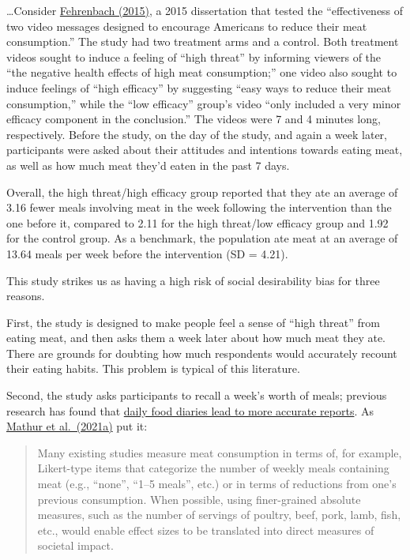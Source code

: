 \documentclass[
  man]{apa6}
\begin{document}
\ldots Consider \href{https://www.proquest.com/docview/1712399091?fromopenview=true&pq-origsite=gscholar}{Fehrenbach (2015)}, a 2015 dissertation that tested the ``effectiveness of two video messages designed to encourage Americans to reduce their meat consumption.'' The study had two treatment arms and a control. Both treatment videos sought to induce a feeling of ``high threat'' by informing viewers of the ``the negative health effects of high meat consumption;'' one video also sought to induce feelings of ``high efficacy'' by suggesting ``easy ways to reduce their meat consumption,'' while the ``low efficacy'' group's video ``only included a very minor efficacy component in the conclusion.'' The videos were 7 and 4 minutes long, respectively. Before the study, on the day of the study, and again a week later, participants were asked about their attitudes and intentions towards eating meat, as well as how much meat they'd eaten in the past 7 days.

Overall, the high threat/high efficacy group reported that they ate an average of 3.16 fewer meals involving meat in the week following the intervention than the one before it, compared to 2.11 for the high threat/low efficacy group and 1.92 for the control group. As a benchmark, the population ate meat at an average of 13.64 meals per week before the intervention (SD = 4.21).

This study strikes us as having a high risk of social desirability bias for three reasons.

First, the study is designed to make people feel a sense of ``high threat'' from eating meat, and then asks them a week later about how much meat they ate. There are grounds for doubting how much respondents would accurately recount their eating habits. This problem is typical of this literature.

Second, the study asks participants to recall a week's worth of meals; previous research has found that \href{https://pubmed.ncbi.nlm.nih.gov/7635601/}{daily food diaries lead to more accurate reports}. As \href{https://www.sciencedirect.com/science/article/pii/S0195666321001847}{Mathur et al.~(2021a)} put it:

\begin{quote}
Many existing studies measure meat consumption in terms of, for example, Likert-type items that categorize the number of weekly meals containing meat (e.g., ``none'', ``1--5 meals'', etc.) or in terms of reductions from one's previous consumption. When possible, using finer-grained absolute measures, such as the number of servings of poultry, beef, pork, lamb, fish, etc., would enable effect sizes to be translated into direct measures of societal impact.
\end{quote}
\end{document}
